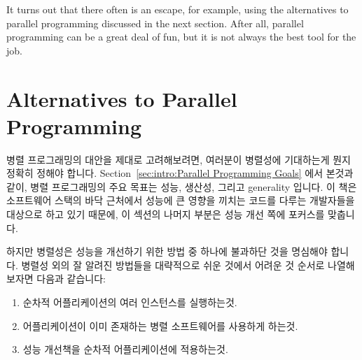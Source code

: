 It turns out that there often is an escape, for example,
using the alternatives to parallel programming discussed in the next section.
After all, parallel programming can be a great deal of fun, but
it is not always the best tool for the job.
\fi

\section{Alternatives to Parallel Programming}
\label{sec:intro:Alternatives to Parallel Programming}

병렬 프로그래밍의 대안을 제대로 고려해보려면, 여러분이 병렬성에 기대하는게
뭔지 정확히 정해야 합니다.
Section~\ref{sec:intro:Parallel Programming Goals} 에서 본것과 같이, 병렬
프로그래밍의 주요 목표는 성능, 생산성, 그리고 generality 입니다.
이 책은 소프트웨어 스택의 바닥 근처에서 성능에 큰 영향을 끼치는 코드를 다루는
개발자들을 대상으로 하고 있기 때문에, 이 섹션의 나머지 부분은 성능 개선 쪽에
포커스를 맞춥니다.

하지만 병렬성은 성능을 개선하기 위한 방법 중 하나에 불과하단 것을 명심해야
합니다.
병렬성 외의 잘 알려진 방법들을 대략적으로 쉬운 것에서 어려운 것 순서로 나열해
보자면 다음과 같습니다:

\begin{enumerate}
\item	순차적 어플리케이션의 여러 인스턴스를 실행하는것.
\item	어플리케이션이 이미 존재하는 병렬 소프트웨어를 사용하게 하는것.
\item	성능 개선책을 순차적 어플리케이션에 적용하는것.

\end{enumerate}

